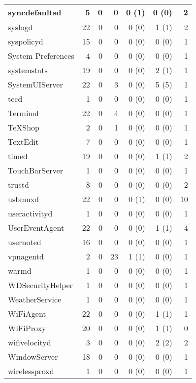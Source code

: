 \begin{adjustwidth}{-2in}{}
\begin{scriptsize}
\begin{longtable}[l]{ l | r | r | r | r | r | r }
    syncdefaultsd &  5 &  0 &  0 &  0 (1) &  0 (0) &  2 \\ \hline
    syslogd & 22 &  0 &  0 &  0 (0) &  1 (1) &  2 \\ \hline
    syspolicyd &  15 &  0 &  0 &  0 (0) &  0 (0) &  1 \\ \hline
    System Preferences &  4 &  0 &  0 &  0 (0) &  0 (0) &  1 \\ \hline
    systemstats & 19 &  0 &  0 &  0 (0) &  2 (1) &  1 \\ \hline
    SystemUIServer &  22 &  0 &  3 &  0 (0) &  5 (5) &  1 \\ \hline
    tccd & 1 &  0 &  0 &  0 (0) &  0 (0) &  1 \\ \hline
    Terminal &  22 &  0 &  4 &  0 (0) &  0 (0) &  1 \\ \hline
    TeXShop &  2 &  0 &  1 &  0 (0) &  0 (0) &  1 \\ \hline
    TextEdit & 7 &  0 &  0 &  0 (0) &  0 (0) &  1 \\ \hline
    timed & 19 &  0 &  0 &  0 (0) &  1 (1) &  2 \\ \hline
    TouchBarServer & 1 &  0 &  0 &  0 (0) &  0 (0) &  1 \\ \hline
    trustd & 8 &  0 &  0 &  0 (0) &  0 (0) &  2 \\ \hline
    usbmuxd & 22 &  0 &  0 &  0 (1) &  0 (0) & 10 \\ \hline
    useractivityd &  1 &  0 &  0 &  0 (0) &  0 (0) &  1 \\ \hline
    UserEventAgent &  22 &  0 &  0 &  0 (0) &  1 (1) &  4 \\ \hline
    usernoted & 16 &  0 &  0 &  0 (0) &  0 (0) &  1 \\ \hline
    vpnagentd &  2 &  0 & 23 &  1 (1) &  0 (0) &  1 \\ \hline
    warmd &  1 &  0 &  0 &  0 (0) &  0 (0) &  1 \\ \hline
    WDSecurityHelper & 1 &  0 &  0 &  0 (0) &  0 (0) &  1 \\ \hline
    WeatherService & 1 &  0 &  0 &  0 (0) &  0 (0) &  1 \\ \hline
    WiFiAgent & 22 &  0 &  0 &  0 (0) &  1 (1) &  1 \\ \hline
    WiFiProxy & 20 &  0 &  0 &  0 (0) &  1 (1) &  0 \\ \hline
    wifivelocityd &  3 &  0 &  0 &  0 (0) &  2 (2) &  2 \\ \hline
    WindowServer &  18 &  0 &  0 &  0 (0) &  0 (0) &  1 \\ \hline
    wirelessproxd &  1 &  0 &  0 &  0 (0) &  0 (0) &  1 \\ \hline

\end{longtable}
\end{scriptsize}
\end{adjustwidth}
